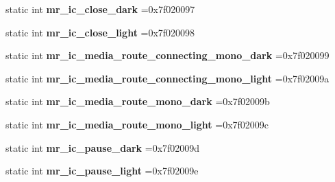 \begin{DoxyCompactItemize}
static int {\bfseries mr\+\_\+ic\+\_\+close\+\_\+dark} =0x7f020097
\item 
\mbox{\label{classandroid_1_1support_1_1v7_1_1recyclerview_1_1R_1_1drawable_a79a8b07a18f620939d1063e42e7fabbb}} 
static int {\bfseries mr\+\_\+ic\+\_\+close\+\_\+light} =0x7f020098
\item 
\mbox{\label{classandroid_1_1support_1_1v7_1_1recyclerview_1_1R_1_1drawable_aab4c481d78c794c26fb09594271e64d9}} 
static int {\bfseries mr\+\_\+ic\+\_\+media\+\_\+route\+\_\+connecting\+\_\+mono\+\_\+dark} =0x7f020099
\item 
\mbox{\label{classandroid_1_1support_1_1v7_1_1recyclerview_1_1R_1_1drawable_adf8061e314f60d803908f320035294f7}} 
static int {\bfseries mr\+\_\+ic\+\_\+media\+\_\+route\+\_\+connecting\+\_\+mono\+\_\+light} =0x7f02009a
\item 
\mbox{\label{classandroid_1_1support_1_1v7_1_1recyclerview_1_1R_1_1drawable_a4193e6c614811d79af25553430be1764}} 
static int {\bfseries mr\+\_\+ic\+\_\+media\+\_\+route\+\_\+mono\+\_\+dark} =0x7f02009b
\item 
\mbox{\label{classandroid_1_1support_1_1v7_1_1recyclerview_1_1R_1_1drawable_ae09e5771b20118df1092d2db99526c45}} 
static int {\bfseries mr\+\_\+ic\+\_\+media\+\_\+route\+\_\+mono\+\_\+light} =0x7f02009c
\item 
\mbox{\label{classandroid_1_1support_1_1v7_1_1recyclerview_1_1R_1_1drawable_afd26d36cc46c6d04aac63ce44bbd4bb6}} 
static int {\bfseries mr\+\_\+ic\+\_\+pause\+\_\+dark} =0x7f02009d
\item 
\mbox{\label{classandroid_1_1support_1_1v7_1_1recyclerview_1_1R_1_1drawable_a9907e390c4eacf5737672889dd7450b6}} 
static int {\bfseries mr\+\_\+ic\+\_\+pause\+\_\+light} =0x7f02009e
\item 
\mbox{\label{classandroid_1_1support_1_1v7_1_1recyclerview_1_1R_1_1drawable_a9f848e1bb9dec3ad72183c65de496a6e}} 

\end{DoxyCompactItemize}
